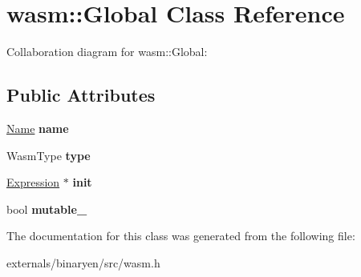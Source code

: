 \hypertarget{classwasm_1_1_global}{}\section{wasm\+:\+:Global Class Reference}
\label{classwasm_1_1_global}


Collaboration diagram for wasm\+:\+:Global\+:
\subsection*{Public Attributes}
\begin{DoxyCompactItemize}
\item 
\mbox{\label{classwasm_1_1_global_ad7199ad601031a341a971d6c2fe9eab2}} 
\mbox{\hyperlink{structwasm_1_1_name}{Name}} {\bfseries name}
\item 
\mbox{\label{classwasm_1_1_global_a68001aec24373209f79bc7afe07a4986}} 
Wasm\+Type {\bfseries type}
\item 
\mbox{\label{classwasm_1_1_global_a587c9ff2227581a742fca52e605cc69f}} 
\mbox{\hyperlink{classwasm_1_1_expression}{Expression}} $\ast$ {\bfseries init}
\item 
\mbox{\label{classwasm_1_1_global_a3b2ed1f97090fc74ac4328dc037eaaab}} 
bool {\bfseries mutable\+\_\+}
\end{DoxyCompactItemize}


The documentation for this class was generated from the following file\+:\begin{DoxyCompactItemize}
\item 
externals/binaryen/src/wasm.\+h\end{DoxyCompactItemize}
